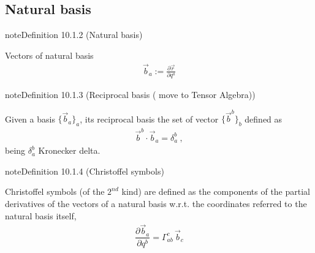 \documentclass[letterpaper,10pt,english]{jupyterBook}
\begin{document}
\subsection{Natural basis}
\label{\detokenize{ch/tensor-algebra-calculus/calculus-euclidean:natural-basis}}\label{\detokenize{ch/tensor-algebra-calculus/calculus-euclidean:tensor-calculus-coordinates-natural-basis}}\label{ch/tensor-algebra-calculus/calculus-euclidean:definition-1}
\begin{sphinxadmonition}{note}{Definition 10.1.2 (Natural basis)}



\sphinxAtStartPar
Vectors of natural basis
\begin{equation*}
\begin{split}\vec{b}_a := \frac{\partial \vec{r}}{\partial q^a}\end{split}
\end{equation*}\end{sphinxadmonition}
\label{ch/tensor-algebra-calculus/calculus-euclidean:definition-2}
\begin{sphinxadmonition}{note}{Definition 10.1.3 (Reciprocal basis ( move to Tensor Algebra))}



\sphinxAtStartPar
Given a basis \(\{ \vec{b}_a \}_{a}\), its reciprocal basis the set of vector \(\{ \vec{b}^b \}_b\) defined as
\begin{equation*}
\begin{split}\vec{b}^b \cdot \vec{b}_a = \delta_{a}^b \ ,\end{split}
\end{equation*}
\sphinxAtStartPar
being \(\delta_a^b\) Kronecker delta.
\end{sphinxadmonition}
\label{ch/tensor-algebra-calculus/calculus-euclidean:definition-3}
\begin{sphinxadmonition}{note}{Definition 10.1.4 (Christoffel symbols)}



\sphinxAtStartPar
Christoffel symbols (of the \(2^{nd}\) kind) are defined as the components of the partial derivatives of the vectors of a natural basis w.r.t. the coordinates referred to the natural basis itself,
\begin{equation}\label{equation:ch/tensor-algebra-calculus/calculus-euclidean:def:christoffel:2}
\begin{split}\dfrac{\partial \vec{b}_a}{\partial q^b} = \Gamma_{ab}^c \, \vec{b}_c\end{split}
\end{equation}\end{sphinxadmonition}
\end{document}
